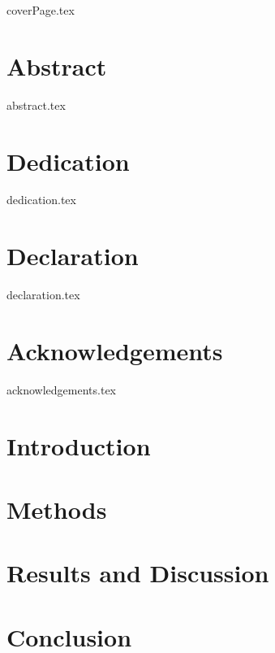 \documentclass[a4paper,12pt]{report}
\begin{document}
\maketitle
\newpage

{coverPage.tex}

\chapter*{Abstract}
{abstract.tex}

\chapter*{Dedication}
{dedication.tex}

\chapter*{Declaration}
{declaration.tex}

\chapter*{Acknowledgements}
{acknowledgements.tex}

\tableofcontents
\listoffigures
\listoftables

\chapter{Introduction}
\label{chap:introduction}


\chapter{Methods}
\label{chap:methods}


\chapter{Results and Discussion}
\label{chap:resultsDiscussion}

\chapter{Conclusion}
\label{chap:conclusion}

\printbibliography[heading=bibintoc, title={References}]
\end{document}
